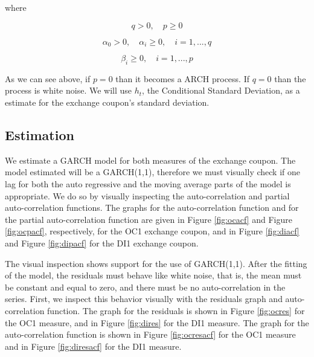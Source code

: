 \documentclass[cic,tc, english]{iiufrgs}
\begin{document}
    where

    $$q > 0, \quad   p \geq 0$$

    $$\alpha_0 > 0, \quad  \alpha_i \geq 0, \quad  i=1,...,q$$

    $$\beta_i \geq 0, \quad  i=1,...,p$$

    As we can see above, if $p = 0$ than it becomes a ARCH process. If $q = 0$ than the process is white noise. We will use $h_t$, the Conditional Standard Deviation, as a estimate for the exchange coupon's standard deviation.

\subsection{Estimation} \label{chapter_estimation}

    We estimate a GARCH model for both measures of the exchange coupon. The model estimated will be a GARCH(1,1), therefore we must visually check if one lag for both the auto regressive and the moving average parts of the model is appropriate. We do so by visually inspecting the auto-correlation and partial auto-correlation functions. The graphs for the auto-correlation function and for the partial auto-correlation function are given in Figure \ref{fig:ocacf} and Figure \ref{fig:ocpacf}, respectively, for the OC1 exchange coupon, and in Figure \ref{fig:diacf} and Figure \ref{fig:dipacf} for the DI1 exchange coupon.

    

    

    

    

    The visual inspection shows support for the use of GARCH(1,1). After the fitting of the model, the residuals must behave like white noise, that is, the mean must be constant and equal to zero, and there must be no auto-correlation in the series. First, we inspect this behavior visually with the residuals graph and auto-correlation function. The graph for the residuals is shown in Figure \ref{fig:ocres} for the OC1 measure, and in Figure \ref{fig:dires} for the DI1 measure. The graph for the auto-correlation function is shown in Figure \ref{fig:ocresacf} for the OC1 measure and in Figure \ref{fig:diresacf} for the DI1 measure.

    

    
\end{document}

